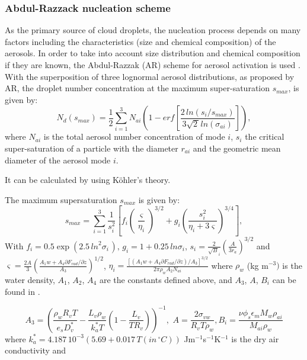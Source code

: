 \subsubsection{Abdul-Razzack nucleation scheme}

As the primary source of cloud droplets, the nucleation process depends on
many factors including the characteristics (size and chemical composition)
of the aerosols. In order to take into account size distribution and
chemical composition if they are known, the Abdul-Razzak (AR) scheme
for aerosol activation is used \cite{Abdul-Razzak:2000}. With the superposition of three
lognormal aerosol distributions, as proposed by AR, the droplet number
concentration at the maximum super-saturation $s_{max}$, is given by:
\begin{equation}
N_{d}\left( s_{max} \right)=\frac{1}{2}\sum\limits_{i=1}^3 {N_{ai}\left(
1-erf\left[ \frac{2\, ln\left( s_{i}/s_{max} \right)}{3\sqrt {2\, } ln\left(
\sigma_{ai} \right)} \right] \right)} ,
\end{equation}
where $N_{ai} $ is the total aerosol number concentration of mode $i$,
$s_{i}$ the critical super-saturation of a particle with the diameter $r_{ai}$ and
the geometric mean diameter of the aerosol mode $i$.

It can be calculated by using K\"{o}hler's theory.

The maximum supersaturation $s_{max} $ is given by:
\begin{equation}
s_{max}=\sum\limits_{i=1}^3 \frac{1}{s_{i}^{2}} \left[ f_{i}\left(
\frac{\varsigma }{\eta_{i}} \right)^{3/2}+g_{i}\left( \frac{s_{i}^{2}}{\eta
_{i}+3\varsigma } \right)^{3/4} \right],
\end{equation}
With $f_{i}=0.5\exp \left( 2.5\, {ln}^{2}\sigma_{i\, } \right),\, g_{i}=1+0.25\, ln\sigma_{i}$,
$s_{i}=\frac{2}{\sqrt B_{i} }\left(\frac{A}{3r_{a}} \right)^{3/2}$
\newline
and $\varsigma =\frac{2A}{3}\left( \frac{A_{1}w+A_{4}\partial
F_{rad}/\partial z}{A_{3}} \right)^{1/2}$, $\eta_{i}=\frac{\left[ \left(
A_{1}w+A_{4}\partial F_{rad}/\partial z \right)/A_{3} \right]^{3/2}}{2\pi
\rho_{w}A_{2}N_{ai}}$
\newline
where $\rho_{w}$ (kg m$^{-3})$ is the water density, $A_{1}$, $A_{2}$,
$A_{4}$ are the constants defined above,
and $A_{3}$, $A$, $B_{i}$ can be found in
 \cite{Abdul-Razzak:2000}.

\begin{equation}
A_{3}=\left( \frac{\rho_{w}R_{v}T}{e_{s}D_{v}^{\ast }}-\frac{L_{v}\rho
_{w}}{k_{a}^{\ast }T}\left( 1-\frac{L_{v}}{TR_{v}} \right) \right)^{-1},\,
\, A=\frac{2\sigma_{vw}}{R_{v}T\rho_{w}},
B_{i}=\frac{\nu \phi_{s}\epsilon_{m}M_{w}\rho_{ai}}{M_{ai}\rho_{w}}
\end{equation}
where $k_{a}^{\ast }=4.187\, {10}^{-3}\left( 5.69+0.017\, T\left( in\,
^{\circ}C \right) \right)$ Jm$^{-1}$s$^{-1}$K$^{-1}$ is the dry air
conductivity and

